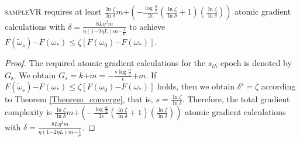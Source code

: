 \documentclass[letterpaper]{article}
\begin{document}
\begin{Theorem}
\label{theorem_gradient_complexity}
\textsc{sampleVR} requires at least  $\frac{\ln \zeta}{\ln \delta}m\mathrm{+}\left( \mathrm{-} \frac{\log\frac{\alpha}{2}}{2\epsilon} (\frac{\ln \zeta}{\ln \delta}+1)(\frac{\ln \zeta}{\ln \delta})\right)$ atomic gradient calculations with $\delta = \frac{8 L \eta^2 m}{ \eta(1\mathrm{-}2\eta L) m  \mathrm{-}  \frac{1}{\mu}    }$ to achieve $F(\tilde{\omega}_s)\mathrm{-}F(\omega_\ast) \le \zeta [F(\omega_0)\mathrm{-}F(\omega_\ast)]$.
\end{Theorem}
\begin{proof}

The required atomic gradient calculations for the $s_{th}$ epoch is denoted by $G_\mathrm{s}$. We obtain
$G_s = k \mathrm{+}m = \mathrm{-} \frac{s\log\frac{\alpha}{2}}{\epsilon}\mathrm{+}m$.
If $F(\tilde{\omega}_s)\mathrm{-}F(\omega_\ast) \le \zeta [F(\omega_0)\mathrm{-}F(\omega_\ast)]$ holds, then we obtain $\delta^s = \zeta$ according to Theorem \ref{Theorem_converge}, that is, $s=\frac{\ln \zeta}{\ln \delta}$. Therefore, the total  gradient complexity is 
$\frac{\ln \zeta}{\ln \delta}m\mathrm{+}\left( \mathrm{-} \frac{\log\frac{\alpha}{2}}{2\epsilon} (\frac{\ln \zeta}{\ln \delta}+1)(\frac{\ln \zeta}{\ln \delta})\right)$ atomic gradient calculations with $\delta = \frac{8 L \eta^2 m}{ \eta(1\mathrm{-}2\eta L) m  \mathrm{-}  \frac{1}{\mu}    }$. 


\end{proof}
\end{document}
